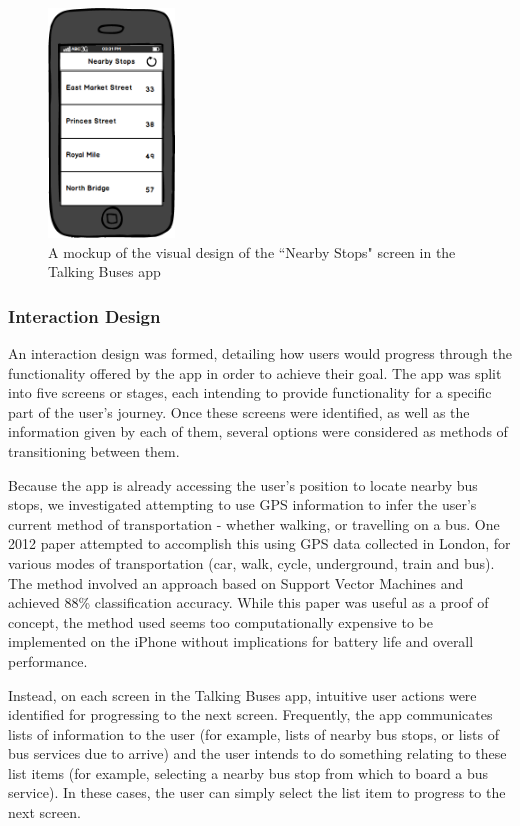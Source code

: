 \documentclass[10pt,twocolumn]{article}
\newcommand{\citep}[1]{}
\begin{document}
\begin{figure}[htbp]
  \centering
    \includegraphics[width=0.3\textwidth]{nearbyMockup}
    \caption{A mockup of the visual design of the ``Nearby Stops" screen in the Talking Buses app}
\end{figure}


\subsubsection{Interaction Design}
An interaction design was formed, detailing how users would progress through the functionality offered by the app in order to achieve their goal.  The app was split into five screens or stages, each intending to provide functionality for a specific part of the user's journey.  Once these screens were identified, as well as the information given by each of them, several options were considered as methods of transitioning between them.

Because the app is already accessing the user's position to locate nearby bus stops, we investigated attempting to use GPS information to infer the user's current method of transportation - whether walking, or travelling on a bus.  One 2012 paper attempted to accomplish this using GPS data collected in London, for various modes of transportation (car, walk, cycle, underground, train and bus). The method involved an approach based on Support Vector Machines and achieved 88\% classification accuracy\citep{infer}. While this paper was useful as a proof of concept, the method used seems too computationally expensive to be implemented on the iPhone without implications for battery life and overall performance.

Instead, on each screen in the Talking Buses app, intuitive user actions were identified for progressing to the next screen.  Frequently, the app communicates lists of information to the user (for example, lists of nearby bus stops, or lists of bus services due to arrive) and the user intends to do something relating to these list items (for example, selecting a nearby bus stop from which to board a bus service). In these cases, the user can simply select the list item to progress to the next screen.
\end{document}
